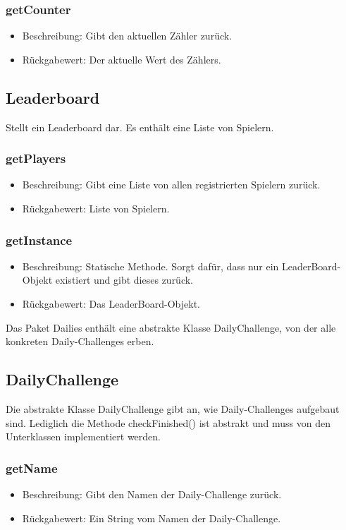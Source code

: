 \documentclass[a4paper]{scrreprt}
\begin{document}
	\subsubsection{getCounter}
	\begin{itemize}
		\item Beschreibung: Gibt den aktuellen Zähler zurück.
		\item Rückgabewert: Der aktuelle Wert des Zählers.
	\end{itemize}
	
	
	\subsection{Leaderboard}
	Stellt ein Leaderboard dar. Es enthält eine Liste von Spielern.
	
	\subsubsection{getPlayers}
	\begin{itemize}
		\item Beschreibung: Gibt eine Liste von allen registrierten Spielern zurück.
		\item Rückgabewert: Liste von Spielern.
	\end{itemize}
	\subsubsection{getInstance}
	\begin{itemize}
		\item Beschreibung: Statische Methode. Sorgt dafür, dass nur ein LeaderBoard-Objekt existiert und gibt dieses zurück.
		\item Rückgabewert: Das LeaderBoard-Objekt.
	\end{itemize}
	
	Das Paket Dailies enthält eine abstrakte Klasse DailyChallenge, von der alle konkreten Daily-Challenges erben.
	
	\subsection{DailyChallenge}
	Die abstrakte Klasse DailyChallenge gibt an, wie Daily-Challenges aufgebaut sind. Lediglich die Methode checkFinished() ist abstrakt und muss von den Unterklassen implementiert werden.
	\subsubsection{getName}
	\begin{itemize}
		\item Beschreibung: Gibt den Namen der Daily-Challenge zurück.
		\item Rückgabewert: Ein String vom Namen der Daily-Challenge.
	\end{itemize}
\end{document}
